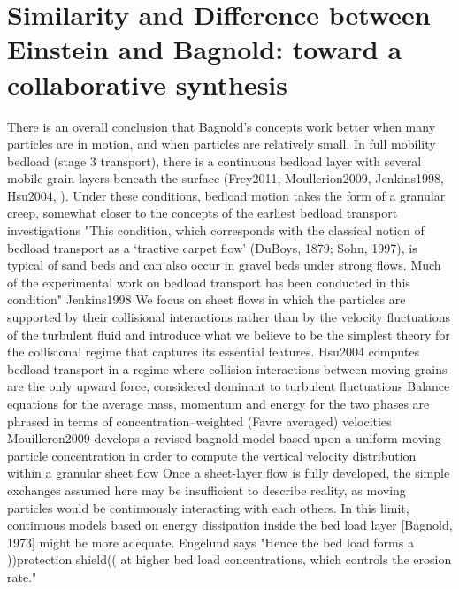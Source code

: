 \documentclass{article}
\begin{document}




\section{Similarity and Difference between Einstein and Bagnold: toward a collaborative synthesis}


There is an overall conclusion that Bagnold's concepts work better when many particles are in motion, and when particles are relatively small. 
In full mobility bedload (stage 3 transport), there is a continuous bedload layer with several mobile grain layers beneath the surface (Frey2011, Moullerion2009, Jenkins1998, Hsu2004, ).
Under these conditions, bedload motion takes the form of a granular creep, somewhat closer to the concepts of the earliest bedload transport investigations
"This condition, which corresponds with the classical notion of bedload transport as a ‘tractive carpet flow’ (DuBoys, 1879; Sohn, 1997), is typical of sand beds and can also occur in gravel beds under strong flows. Much of the experimental work on bedload transport has been conducted in this condition"
Jenkins1998 We focus on sheet flows in which the particles are supported by their collisional interactions rather than by the velocity fluctuations of the turbulent fluid and introduce what we believe to be the simplest theory for the collisional regime that captures its essential features.
Hsu2004 computes bedload transport in a regime where collision interactions between moving grains are the only upward force, considered dominant to turbulent fluctuations
Balance equations for the average mass, momentum and energy for the two phases are phrased in terms of concentration–weighted (Favre averaged) velocities
Mouilleron2009 develops a revised bagnold model based upon a uniform moving particle concentration in order to compute the vertical velocity distribution within a granular sheet flow 
Once a sheet-layer flow is fully developed, the simple exchanges assumed here may be insufficient to describe reality, as moving particles would be continuously interacting with each others. In this limit, continuous models based on energy dissipation inside the bed load layer [Bagnold, 1973] might be more adequate.
Engelund says "Hence the bed load forms a ))protection shield(( at higher bed load concentrations, which controls the erosion rate."
\end{document}
